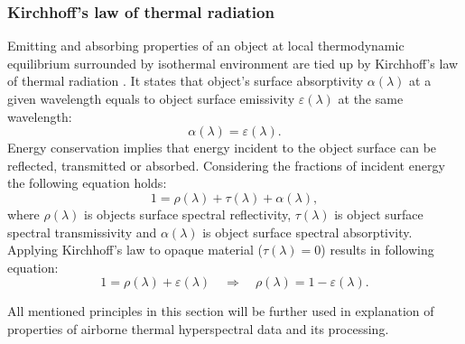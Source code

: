 \subsubsection*{Kirchhoff's law of thermal radiation}
Emitting and absorbing properties of an object at local thermodynamic equilibrium surrounded by isothermal environment are tied up by Kirchhoff's law of thermal radiation \cite{K60}. It states that object's surface absorptivity $\alpha(\lambda)$ at a given wavelength equals to object surface emissivity $\varepsilon(\lambda)$ at the same wavelength:
$$ \alpha(\lambda) = \varepsilon(\lambda). $$
Energy conservation implies that energy incident to the object surface can be reflected, transmitted or absorbed. Considering the fractions of incident energy the following equation holds:
$$ 1 = \rho(\lambda) + \tau(\lambda) + \alpha(\lambda), $$
where $\rho(\lambda)$ is objects surface spectral reflectivity, $\tau(\lambda)$ is object surface spectral transmissivity and $\alpha(\lambda)$ is object surface spectral absorptivity. Applying Kirchhoff's law to opaque material ($\tau(\lambda) = 0$) results in following equation:
$$ 1 = \rho(\lambda) + \varepsilon(\lambda) \quad \Rightarrow \quad \rho(\lambda) = 1 - \varepsilon(\lambda).$$

All mentioned principles in this section will be further used in explanation of properties of airborne thermal hyperspectral data and its processing.